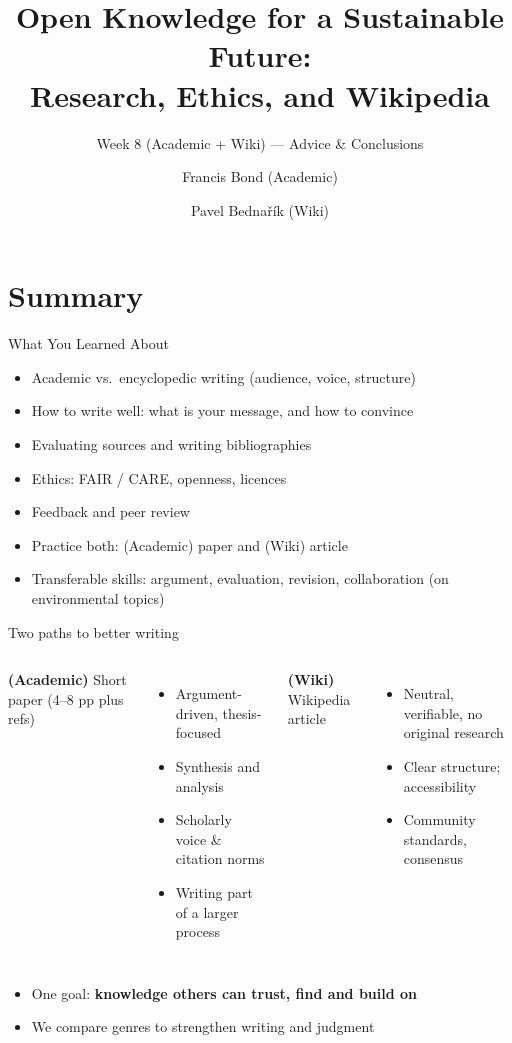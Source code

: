 \documentclass[aspectratio=169]{beamer}
\title[Open Knowledge --- Conclusions]{Open Knowledge for a Sustainable Future:\\ Research, Ethics, and Wikipedia}
\subtitle{Week 8 (Academic + Wiki) — Advice \& Conclusions}
\author[Bond \& Bednařík]{Francis Bond (Academic) \and Pavel Bednařík (Wiki)}
\institute[UPOL \& Wikimedia]{Palacký University Olomouc \quad | \quad Wikimedia ČR}
\date{}
\begin{document}
\begin{frame}
  \titlepage
\end{frame}


\section{Summary}

\begin{frame}{What You Learned About}
\begin{itemize}
  \item Academic vs.\ encyclopedic writing (audience, voice, structure)
  \item How to write well: what is your message, and how to convince
  \item Evaluating sources and writing bibliographies
  \item Ethics: FAIR / CARE, openness, licences
  \item Feedback and peer review
  \item Practice both: (Academic) paper and (Wiki) article
  \item Transferable skills: argument, evaluation, revision, collaboration (on environmental topics)
\end{itemize}
\end{frame}

\begin{frame}{Two paths to better writing}
\begin{columns}[T,onlytextwidth]
\textbf{(Academic)} Short paper (4--8 pp plus refs)
\begin{itemize}
  \item Argument-driven, thesis-focused
  \item Synthesis and analysis
  \item Scholarly voice \& citation norms
  \item Writing part of a larger process
\end{itemize}

\textbf{(Wiki)} Wikipedia article
\begin{itemize}
  \item Neutral, verifiable, no original research
  \item Clear structure; accessibility
  \item Community standards, consensus
\end{itemize}
\end{columns}

\vspace{3ex}
\begin{itemize}
  \item One goal: \textbf{knowledge others can trust, find and build on}
  \item We compare genres to strengthen writing and judgment
\end{itemize}
\end{frame}
\end{document}
